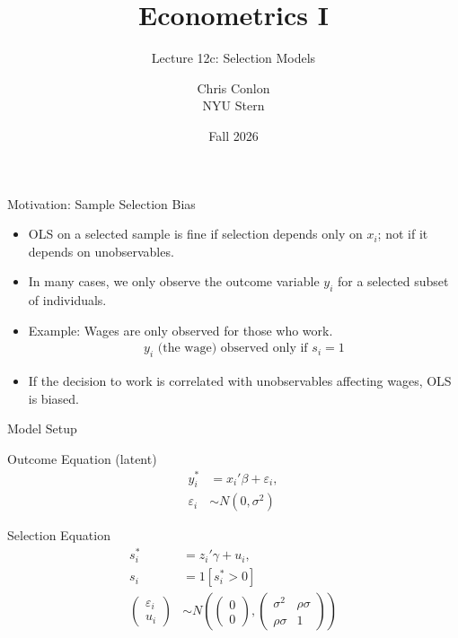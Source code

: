 \documentclass[aspectratio=169,11pt]{beamer}
\title[L12c - Selection]{ Econometrics I}
\subtitle{Lecture 12c: Selection Models}
\author{Chris Conlon \\NYU Stern}
\date{Fall 2026}
\begin{document}
\frame{\titlepage}


\begin{frame}{Motivation: Sample Selection Bias}
\begin{itemize}
    \item OLS on a selected sample is fine if selection depends only on $x_i$; not if it depends on unobservables.
    \item In many cases, we only observe the outcome variable $y_i$ for a selected subset of individuals.
    \item Example: Wages are only observed for those who work.
    \begin{align*}
    y_i \text{ (the wage) observed only if } s_i = 1
    \end{align*}
    \item If the decision to work is correlated with unobservables affecting wages, OLS is biased.
\end{itemize}
\end{frame}

\begin{frame}{Model Setup}
\begin{block}{Outcome Equation (latent)}
\begin{align*}
y_i^* &= x_i'\beta + \varepsilon_i, \\
\varepsilon_i &\sim N(0, \sigma^2)
\end{align*}
\end{block}

\begin{block}{Selection Equation}
\begin{align*}
s_i^* &= z_i'\gamma + u_i, \\
s_i &= 1[s_i^* > 0]\\
\begin{pmatrix} \varepsilon_i \\ u_i \end{pmatrix}
&\sim N \left(
\begin{pmatrix} 0 \\ 0 \end{pmatrix},
\begin{pmatrix}
\sigma^2 & \rho\sigma \\
\rho\sigma & 1
\end{pmatrix}
\right)
\end{align*}
\end{block}
\end{frame}
\end{document}
